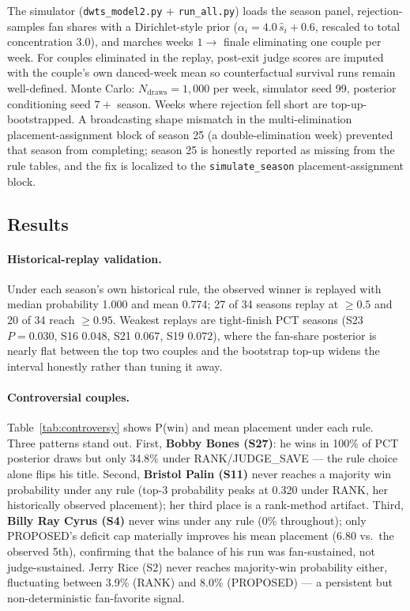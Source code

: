 \documentclass[11pt]{article}
\begin{document}
The simulator (\texttt{dwts\_model2.py} + \texttt{run\_all.py}) loads
the season panel, rejection-samples fan shares with a Dirichlet-style
prior ($\alpha_i = 4.0\,\hat{s}_i + 0.6$, rescaled to total concentration
3.0), and marches weeks $1 \to$ finale eliminating one couple per week.
For couples eliminated in the replay, post-exit judge scores are imputed
with the couple's own danced-week mean so counterfactual survival runs
remain well-defined. Monte Carlo: $N_{\text{draws}} = 1{,}000$ per week,
simulator seed 99, posterior conditioning seed $7 +$ season. Weeks where
rejection fell short are top-up-bootstrapped. A broadcasting shape
mismatch in the multi-elimination placement-assignment block of season
25 (a double-elimination week) prevented that season from completing;
season 25 is honestly reported as missing from the rule tables, and the
fix is localized to the \texttt{simulate\_season} placement-assignment
block.

\subsection{Results}

\paragraph{Historical-replay validation.} Under each season's own
historical rule, the observed winner is replayed with median probability
1.000 and mean 0.774; 27 of 34 seasons replay at $\ge 0.5$ and 20 of 34
reach $\ge 0.95$. Weakest replays are tight-finish PCT seasons (S23
$P=0.030$, S16 $0.048$, S21 $0.067$, S19 $0.072$), where the fan-share
posterior is nearly flat between the top two couples and the bootstrap
top-up widens the interval honestly rather than tuning it away.

\paragraph{Controversial couples.} Table~\ref{tab:controversy} shows
P(win) and mean placement under each rule. Three patterns stand out.
First, \textbf{Bobby Bones (S27)}: he wins in 100\% of PCT posterior
draws but only 34.8\% under RANK/JUDGE\_SAVE --- the rule choice alone
flips his title. Second, \textbf{Bristol Palin (S11)} never reaches a
majority win probability under any rule (top-3 probability peaks at
0.320 under RANK, her historically observed placement); her third place
is a rank-method artifact. Third, \textbf{Billy Ray Cyrus (S4)} never
wins under any rule (0\% throughout); only PROPOSED's deficit cap
materially improves his mean placement (6.80 vs.\ the observed 5th),
confirming that the balance of his run was fan-sustained, not
judge-sustained. Jerry Rice (S2) never reaches majority-win probability
either, fluctuating between 3.9\% (RANK) and 8.0\% (PROPOSED) --- a
persistent but non-deterministic fan-favorite signal.
\end{document}
